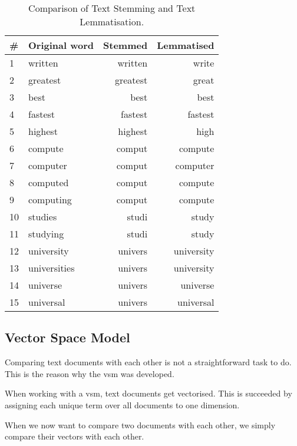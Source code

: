 \begin{table}[h]
    \centering
    \begin{tabular}{|l|l|r|r|}
    \hline
    \textbf{\#} & \textbf{Original word} & \textbf{Stemmed} & \textbf{Lemmatised} \\ \hline
    1 & written & written & write \\ \hline
    2 & greatest & greatest & great \\ \hline
    3 & best & best & best \\ \hline
    4 & fastest & fastest & fastest \\ \hline
    5 & highest & highest & high \\ \hline
    6 & compute & comput & compute \\ \hline
    7 & computer & comput & computer \\ \hline
    8 & computed & comput & compute \\ \hline
    9 & computing & comput & compute \\ \hline
    10 & studies & studi & study \\ \hline
    11 & studying & studi & study \\ \hline
    12 & university & univers & university \\ \hline
    13 & universities & univers & university \\ \hline
    14 & universe & univers & universe \\ \hline
    15 & universal & univers & universal \\ \hline
    \end{tabular}
    \caption{Comparison of Text Stemming and Text Lemmatisation.}
    \label{tab:comparison_stemming_lemmatisation}
\end{table}


\subsection{Vector Space Model}
Comparing text documents with each other is not a straightforward task to do.
This is the reason why the \gls{vsm} was developed.

When working with a \gls{vsm}, text documents get vectorised.
This is succeeded by assigning each unique term over all documents to one dimension.

When we now want to compare two documents with each other,
we simply compare their vectors with each other.

